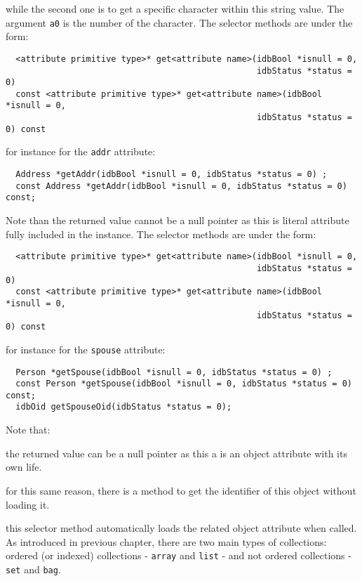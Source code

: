 while the second one is to get a specific character within this string value.
The argument \texttt{a0} is the number of the character.
The selector methods are under the form:
\verbsize
\begin{verbatim}
  <attribute primitive type>* get<attribute name>(idbBool *isnull = 0,
                                                  idbStatus *status = 0)
  const <attribute primitive type>* get<attribute name>(idbBool *isnull = 0,
                                                  idbStatus *status = 0) const
\end{verbatim}
\normalsize
for instance for the \texttt{addr} attribute:
\verbsize
\begin{verbatim}
  Address *getAddr(idbBool *isnull = 0, idbStatus *status = 0) ;
  const Address *getAddr(idbBool *isnull = 0, idbStatus *status = 0) const;
\end{verbatim}
\normalsize
Note than the returned value cannot be a null pointer as this is literal
attribute fully included in the instance.
The selector methods are under the form:
\verbsize
\begin{verbatim}
  <attribute primitive type>* get<attribute name>(idbBool *isnull = 0,
                                                  idbStatus *status = 0)
  const <attribute primitive type>* get<attribute name>(idbBool *isnull = 0,
                                                  idbStatus *status = 0) const
\end{verbatim}
\normalsize
for instance for the \texttt{spouse} attribute:
\verbsize
\begin{verbatim}
  Person *getSpouse(idbBool *isnull = 0, idbStatus *status = 0) ;
  const Person *getSpouse(idbBool *isnull = 0, idbStatus *status = 0) const;
  idbOid getSpouseOid(idbStatus *status = 0);
\end{verbatim}
\normalsize
Note that:
\be
\item the returned value can be a null pointer as this a is
an object attribute with its own life.
\item for this same reason, there is a method to get the identifier of this
object without loading it.
\item this selector method automatically loads the related object attribute
when called.
\ee
{}
As introduced in previous chapter, there are two main types of collections:
ordered (or indexed) collections - \texttt{array} and \texttt{list} - and not
ordered collections - \texttt{set} and \texttt{bag}.
